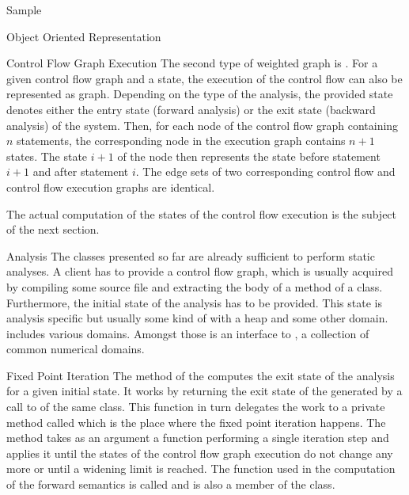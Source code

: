 \begin{chapter}{Sample}
\begin{section}{Object Oriented Representation}
		\begin{subsection}{Control Flow Graph Execution}
			The second type of weighted graph is . For a given control flow graph and a state, the execution of the control flow can also be represented as graph. Depending on the type of the analysis, the provided state denotes either the entry state (forward analysis) or the exit state (backward analysis) of the system. Then, for each node of the control flow graph containing $n$ statements, the corresponding node in the execution graph contains $n+1$ states. The state $i+1$ of the node then represents the state before statement $i+1$ and after statement $i$. The edge sets of two corresponding control flow and control flow execution graphs are identical.

			The actual computation of the states of the control flow execution is the subject of the next section.
		\end{subsection}


		\begin{subsection}{Analysis}
			The classes presented so far are already sufficient to perform static analyses. A client has to provide a control flow graph, which is usually acquired by compiling some source file and extracting the body of a method of a class. Furthermore, the initial state of the analysis has to be provided. This state is analysis specific but usually some kind of  with a heap and some other domain. \sample includes various domains. Amongst those is an interface to \apron \cite{jeannet09}, a collection of common numerical domains. 


			\begin{subsubsection}{Fixed Point Iteration}
				\label{subsection:FixedPointIteration}
				The method  of the  computes the exit state of the analysis for a given initial state. It works by returning the exit state of the  generated by a call to  of the same class. This function in turn delegates the work to a private method called  which is the place where the fixed point iteration happens. The method takes as an argument a function performing a single iteration step and applies it until the states of the control flow graph execution do not change any more or until a widening limit is reached. The function used in the computation of the forward semantics is called  and is also a member of the  class.


\end{subsubsection}
\end{subsection}
\end{section}
\end{chapter}
